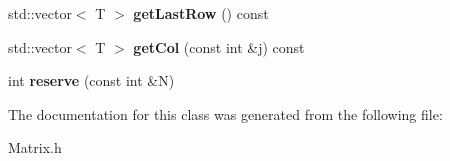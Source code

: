 \begin{DoxyCompactItemize}
\item 
\hypertarget{classkeycpp_1_1matrix_a20002e97217bcc6382e60694bf898e1f}{std\-::vector$<$ T $>$ {\bfseries get\-Last\-Row} () const }\label{classkeycpp_1_1matrix_a20002e97217bcc6382e60694bf898e1f}

\item 
\hypertarget{classkeycpp_1_1matrix_a9c16ead5c2a61eb35c33328caa235b2f}{std\-::vector$<$ T $>$ {\bfseries get\-Col} (const int \&j) const }\label{classkeycpp_1_1matrix_a9c16ead5c2a61eb35c33328caa235b2f}

\item 
\hypertarget{classkeycpp_1_1matrix_a719eb1cb62d0cd9168abe2235235f278}{int {\bfseries reserve} (const int \&N)}\label{classkeycpp_1_1matrix_a719eb1cb62d0cd9168abe2235235f278}

\end{DoxyCompactItemize}


The documentation for this class was generated from the following file\-:\begin{DoxyCompactItemize}
\item 
Matrix.\-h\end{DoxyCompactItemize}
